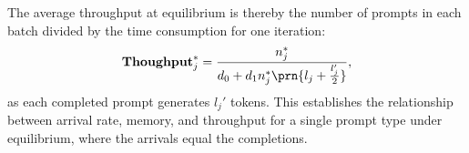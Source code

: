 The average throughput at equilibrium is thereby the number of prompts in each batch divided by the time consumption for one iteration:
\begin{equation}\label{eq:throughput_fluid}
\throughput_j^* = \frac{n_j^*}{d_0+d_1n_j^*\prn{l_j+\frac{l_j'}{2}}},
\end{equation}
as each completed prompt generates \(l_j'\) tokens. This establishes the relationship between arrival rate, memory, and throughput for a single prompt type under equilibrium, where the arrivals equal the completions.


